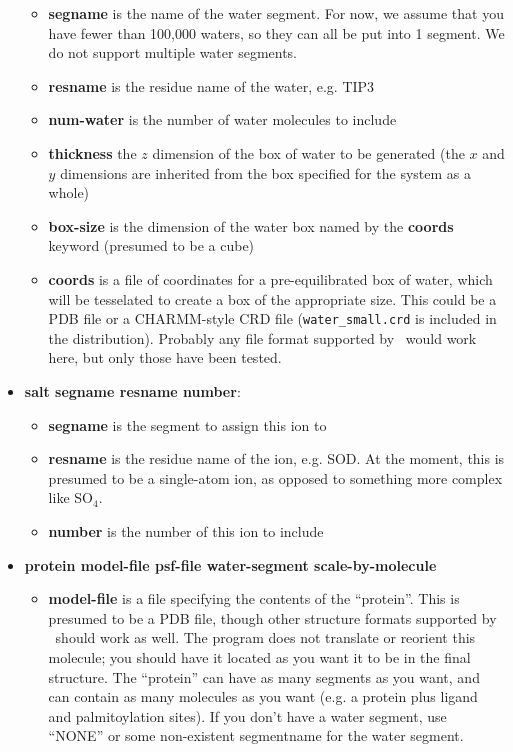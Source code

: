 \documentclass[12pt]{article}
\begin{document}
\begin{itemize}
          \begin{itemize}
             \item {\bf segname} is the name of the water segment.  For now,
             we assume that you have fewer than 100,000 waters, so they can
             all be put into 1 segment.  We do not support multiple water
             segments.
             \item {\bf resname} is the residue name of the water, e.g. TIP3
             \item {\bf num-water} is the number of water molecules to
             include
             \item {\bf thickness} the $z$ dimension of the box of water to be
             generated (the $x$ and $y$ dimensions are inherited from the box
             specified for the system as a whole)
             \item {\bf box-size} is the dimension of the water box named by
             the {\bf coords} keyword (presumed to be a cube)
             \item {\bf coords} is a file of coordinates for a
             pre-equilibrated box of water, which will be tesselated to
             create a box of the appropriate size.  This could be a PDB file or 
             a CHARMM-style CRD file ({\tt water\_small.crd} is included in the
             distribution).  Probably any file format supported by
             \loos\ would work here, but only those have been tested.
          \end{itemize}
     \item {\bf salt segname resname number}:
          \begin{itemize}
            \item {\bf segname} is the segment to assign this ion to
            \item {\bf resname} is the residue name of the ion, e.g. SOD.  At
            the moment, this is presumed to be a single-atom ion, as opposed
            to something more complex like SO$_4$.
            \item {\bf number} is the number of this ion to include
          \end{itemize}
     \item {\bf protein model-file psf-file water-segment scale-by-molecule}
          \begin{itemize}
            \item {\bf model-file} is a file specifying the contents of the
            ``protein''.  This is presumed to be a PDB file, though other
            structure formats supported by \loos\ should work as well.  The
            program does not translate or reorient this molecule; you
            should have it located as you want it to be in the final
            structure.   The ``protein'' can have as many segments as you
            want, and can contain as many molecules as you want (e.g. a
            protein plus ligand and palmitoylation sites).  If you don't
            have a water segment, use ``NONE'' or some non-existent
            segmentname for the water segment.  


\end{itemize}
\end{itemize}
\end{document}
